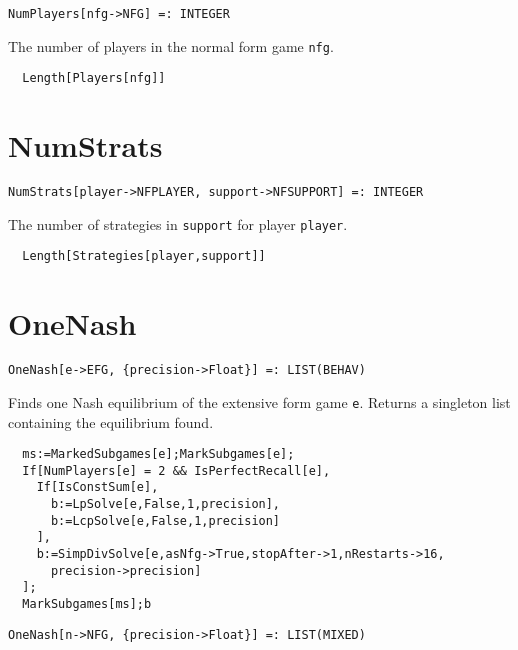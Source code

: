 \newsignature

\begin{verbatim}
NumPlayers[nfg->NFG] =: INTEGER 
\end{verbatim}

\noindent
The number of players in the normal form game \verb+nfg+.

\udfbody
\begin{verbatim}
  Length[Players[nfg]]
\end{verbatim} 


\section*{NumStrats}\label{ExtNumStrats}
\begin{verbatim}
NumStrats[player->NFPLAYER, support->NFSUPPORT] =: INTEGER 
\end{verbatim}

\noindent
The number of strategies in \verb+support+ for player \verb+player+.

\udfbody
\begin{verbatim}
  Length[Strategies[player,support]] 
\end{verbatim} 


\section*{OneNash}\label{ExtOneNash}
\begin{verbatim}
OneNash[e->EFG, {precision->Float}] =: LIST(BEHAV) 
\end{verbatim}

\noindent
Finds one Nash equilibrium of the extensive form game \verb+e+.
Returns a singleton list containing the equilibrium found.

\udfbody
\begin{verbatim}
  ms:=MarkedSubgames[e];MarkSubgames[e];
  If[NumPlayers[e] = 2 && IsPerfectRecall[e],
    If[IsConstSum[e],
      b:=LpSolve[e,False,1,precision],
      b:=LcpSolve[e,False,1,precision]
    ],
    b:=SimpDivSolve[e,asNfg->True,stopAfter->1,nRestarts->16,
      precision->precision]
  ];
  MarkSubgames[ms];b
\end{verbatim} 

\newsignature

\begin{verbatim}
OneNash[n->NFG, {precision->Float}] =: LIST(MIXED) 
\end{verbatim}

